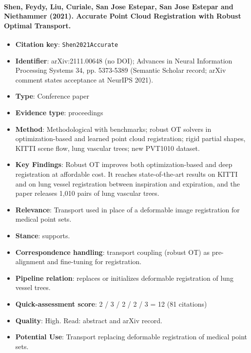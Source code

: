 \documentclass[journal,onecolumn]{IEEEtran}
\begin{document}
\paragraph{Shen, Feydy, Liu, Curiale, San Jose Estepar, San Jose Estepar and Niethammer (2021). Accurate Point Cloud Registration with Robust Optimal Transport.~\cite{Shen2021Accurate}}\mbox{}

\begin{itemize}

\item{} \textbf{Citation key}: \texttt{Shen2021Accurate}

\item{} \textbf{Identifier}: arXiv:2111.00648 (no DOI); Advances in Neural Information Processing Systems 34, pp. 5373-5389 (Semantic Scholar record; arXiv comment states acceptance at NeurIPS 2021).

\item{} \textbf{Type}: Conference paper

\item{} \textbf{Evidence type}: proceedings

\item{} \textbf{Method}: Methodological with benchmarks; robust OT solvers in optimization-based and learned point cloud registration; rigid partial shapes, KITTI scene flow, lung vascular trees; new PVT1010 dataset.

\item{} \textbf{Key Findings}: Robust OT improves both optimization-based and deep registration at affordable cost. It reaches state-of-the-art results on KITTI and on lung vessel registration between inspiration and expiration, and the paper releases 1,010 pairs of lung vascular trees.

\item{} \textbf{Relevance}: Transport used in place of a deformable image registration for medical point sets.

\item{} \textbf{Stance}: supports.

\item{} \textbf{Correspondence handling}: transport coupling (robust OT) as pre-alignment and fine-tuning for registration.

\item{} \textbf{Pipeline relation}: replaces or initializes deformable registration of lung vessel trees.

\item{} \textbf{Quick-assessment score}: 2 / 3 / 2 / 2 / 3 = 12 (81 citations)

\item{} \textbf{Quality}: High. Read: abstract and arXiv record.

\item{} \textbf{Potential Use}: Transport replacing deformable registration of medical point sets.

\end{itemize}
\end{document}
